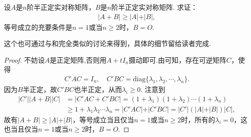 \documentclass[../../main.tex]{subfiles}%
\begin{document}
\begin{proposition}\label{proposition:例9.76}
设\(A\)是\(n\)阶半正定实对称矩阵，\(B\)是\(n\)阶半正定实对称矩阵. 求证：
\begin{align*}
\vert A + B\vert\geqslant \vert A\vert+\vert B\vert,
\end{align*}
等号成立的充要条件是\(n = 1\)或当\(n\geqslant 2\)时，\(B = O\).
\end{proposition}
\begin{remark}
这个也可通过与和完全类似的讨论来得到，具体的细节留给读者完成. 
\end{remark}
\begin{proof}

不妨设$A$是正定矩阵,否则用$A+tI_n$摄动即可.由可知，存在可逆矩阵\(C\)，使得
\begin{align*}
C'AC = I_n,\quad C'BC = \mathrm{diag}\{\lambda_1,\lambda_2,\cdots,\lambda_n\}.
\end{align*}
因为\(B\)半正定，故\(C'BC\)也半正定，从而\(\lambda_i\geqslant 0\). 注意到
\begin{align*}
\vert C'\vert\vert A + B\vert\vert C\vert&=\vert C'AC + C'BC\vert=(1 + \lambda_1)(1 + \lambda_2)\cdots(1 + \lambda_n)\\
&\geqslant 1 + \lambda_1\lambda_2\cdots\lambda_n=\vert C'AC\vert+\vert C'BC\vert=\vert C'\vert(\vert A\vert+\vert B\vert)\vert C\vert,
\end{align*}
故有\(\vert A + B\vert\geqslant \vert A\vert+\vert B\vert\)，等号成立当且仅当\(n = 1\)或当\(n\geqslant 2\)时，所有的\(\lambda_i = 0\)，这也当且仅当\(n = 1\)或当\(n\geqslant 2\)时，\(B = O\).

\end{proof}
\end{document}
